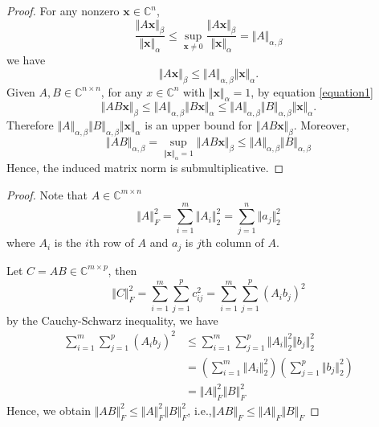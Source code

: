 \documentclass[12pt]{article}
\begin{document}

\begin{proof}
    For any nonzero $\mathbf{x} \in \mathbb{C}^n$, \[\frac{\Vert A\mathbf{x} \Vert_\beta}{\Vert \mathbf{x} \Vert_\alpha} \leq \sup_{\mathbf{x} \neq 0}\frac{\Vert A\mathbf{x} \Vert_\beta}{\Vert \mathbf{x} \Vert_\alpha}=\Vert A \Vert_{\alpha,\beta}\]
    we have 
    \begin{equation}\label{equation1}
        \Vert A\mathbf{x} \Vert_\beta \leq \Vert A \Vert_{\alpha,\beta} \Vert \mathbf{x} \Vert_\alpha.
    \end{equation}
    Given $A,B \in \mathbb{C}^{n \times n}$, for any $x \in \mathbb{C}^n$ with $\Vert \mathbf{x} \Vert_\alpha=1$, by equation \ref{equation1}
    \[\Vert AB\mathbf{x} \Vert_\beta \leq \Vert A \Vert_{\alpha,\beta} \Vert B \mathbf{x}\Vert_\alpha \leq \Vert A \Vert_{\alpha,\beta}\Vert B \Vert_{\alpha,\beta} \Vert \mathbf{x} \Vert_\alpha. \]
    Therefore $\Vert A \Vert_{\alpha,\beta}\Vert B \Vert_{\alpha,\beta} \Vert \mathbf{x} \Vert_\alpha$ is an upper bound for $\Vert AB\mathbf{x} \Vert_\beta$.
    Moreover, 
    \[\Vert AB \Vert_{\alpha,\beta}=\sup_{\Vert \mathbf{x} \Vert_\alpha= 1}{\Vert AB\mathbf{x} \Vert_\beta} \leq \Vert A \Vert_{\alpha,\beta}\Vert B \Vert_{\alpha,\beta}\]
    Hence, the induced matrix norm is submultiplicative.
\end{proof}


\begin{proof}
    Note that $A \in \mathbb{C}^{m \times n}$
    \[\Vert A\Vert_F^2=\sum_{i=1}^m \Vert A_i \Vert_2^2=\sum_{j=1}^n \Vert a_j \Vert_2^2\]
    where $A_i$ is the $i$th row of $A$ and $a_j$ is $j$th column of $A$. 
    
    Let $C=AB \in \mathbb{C}^{m \times p}$, then
    \[\Vert C\Vert_F^2=\sum_{i=1}^m \sum_{j=1}^p {c_{ij}^2}=\sum_{i=1}^m \sum_{j=1}^p {(A_ib_j)^2}\]
    by the Cauchy-Schwarz inequality, we have
    \begin{align*}
        \sum_{i=1}^m \sum_{j=1}^p {(A_ib_j)^2} 
        &\leq \sum_{i=1}^m \sum_{j=1}^p {\Vert A_i \Vert_2^2 \Vert b_j \Vert_2^2}\\
        &=\left(\sum_{i=1}^m{\Vert A_i \Vert_2^2}\right)\left(\sum_{j=1}^p{\Vert b_j \Vert_2^2}\right)\\
        &=\Vert A \Vert_F^2 \Vert B \Vert_F^2
    \end{align*}
    Hence, we obtain $\Vert AB\Vert_F^2 \leq \Vert A \Vert_F^2 \Vert B \Vert_F^2$, i.e.,$\Vert AB\Vert_F \leq \Vert A \Vert_F \Vert B \Vert_F$
\end{proof}
\end{document}
